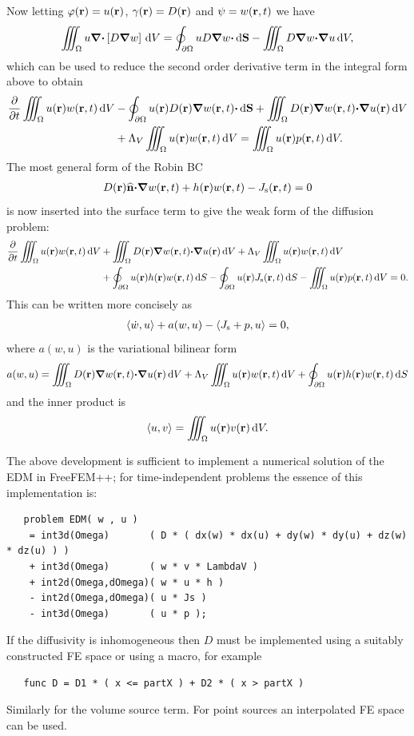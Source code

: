 \documentclass[a4paper]{article}
\numberwithin{equation}{section}
\providecommand\oiint{\oint}
\begin{document}
Now letting $\varphi(\boldsymbol{\mathrm{r}})=u(\boldsymbol{\mathrm{r}})$, $\gamma(\boldsymbol{\mathrm{r}})=D(\boldsymbol{\mathrm{r}})$ and $\psi=w(\boldsymbol{\mathrm{r}},t)$ we have
\begin{align}
\iiint_{\Omega} u{\vnabla}{\vcdot}\left[D{\vnabla}w\right]\dif{V}
=\oiint_{\partial\Omega } uD{\vnabla}w{\vcdot}\dif{\vS}
-\iiint_{\Omega} D{\vnabla}w{\vcdot}{\vnabla}u\dif{V},
\end{align}
which can be used to reduce the second order derivative term in the integral form above to obtain
\begin{align}
\frac{{\partial}}{{\partial}t}\iiint_{\Omega} u\pr w\prt\dif{V}
&-\oiint_{\partial\Omega} u\pr D\pr {\vnabla}w\prt{\vcdot}\dif{\vS}
+\iiint_{\Omega} D\pr{\vnabla}w\prt{\vcdot}{\vnabla}u\pr\dif{V} \nonumber\\
&+\Lambda_V \iiint_{\Omega} u\pr w\prt\dif{V}
=\iiint_{\Omega} u\pr p\prt\dif{V}.
\end{align}
The most general form of the Robin BC
\begin{align}
D(\boldsymbol{\mathrm{r}})\widehat{\boldsymbol{\mathrm{n}}}{\boldsymbol{\mathrm{\cdot}}}{\boldsymbol{\mathrm{\nabla}}} w(\boldsymbol{\mathrm{r}},t) +h(\boldsymbol{\mathrm{r}}) w(\boldsymbol{\mathrm{r}},t)-J_{\mathrm{s}}(\boldsymbol{\mathrm{r}},t)=0
\end{align}
is now inserted into the surface term to give the weak form of the diffusion
problem:
\begin{align}
\frac{{\partial}}{{\partial}t}\iiint_{\Omega} u\pr w\prt\dif{V}
&+\iiint_{\Omega} D\pr{\vnabla}w\prt{\vcdot}{\vnabla}u\pr\dif{V}
+\Lambda_V \iiint_{\Omega} u\pr w\prt\dif{V} \nonumber \\
&+\oiint_{\partial\Omega} u\pr h\pr w\prt\dif{S}
-\oiint_{\partial\Omega} u\pr J_\rs\prt\dif{S}
-\iiint_{\Omega} u\pr p\prt\dif{V}=0.
\end{align}
This can be written more concisely as
\begin{align}
\langle \dot{w},u \rangle + a(w,u) - \langle J_{\mathrm{s}}+p ,u \rangle = 0,
\end{align}
where $a(w,u)$ is the variational bilinear form
\begin{align}
a(w,u)
=\iiint_{\Omega} D\pr{\vnabla}w\prt{\vcdot}{\vnabla}u\pr\dif{V}
+\Lambda_V \iiint_{\Omega} u\pr w\prt\dif{V}
+\oiint_{\partial\Omega} u\pr h\pr w\prt\dif{S}
\end{align}
and the inner product is
\begin{align}
\langle u , v \rangle
= \iiint_{\Omega} u(\boldsymbol{\mathrm{r}}) v(\boldsymbol{\mathrm{r}}) \,\mathrm{d}{V}.
\end{align}

The above development is sufficient to implement a numerical solution of the EDM in FreeFEM++; for 
time-independent problems the essence of this implementation is:
\begin{verbatim}
   problem EDM( w , u ) 
    = int3d(Omega)       ( D * ( dx(w) * dx(u) + dy(w) * dy(u) + dz(w) * dz(u) ) )
    + int3d(Omega)       ( w * v * LambdaV )
    + int2d(Omega,dOmega)( w * u * h )   
    - int2d(Omega,dOmega)( u * Js )
    - int3d(Omega)       ( u * p );
\end{verbatim}
If the diffusivity is inhomogeneous then $D$ must be implemented using a
suitably constructed FE space or using a macro, for example
\begin{verbatim}
   func D = D1 * ( x <= partX ) + D2 * ( x > partX )  
\end{verbatim}
Similarly for the volume source term. For point sources an interpolated 
FE space can be used.
\end{document}
